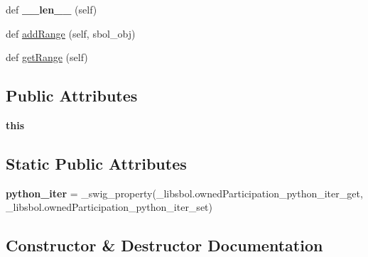 \begin{DoxyCompactItemize}
\item 
def {\bfseries \+\_\+\+\_\+len\+\_\+\+\_\+} (self)\hypertarget{classsbol_1_1libsbol_1_1owned_participation_a664aa8ce4ef4f8f430398587d65712b4}{}\label{classsbol_1_1libsbol_1_1owned_participation_a664aa8ce4ef4f8f430398587d65712b4}

\item 
def \hyperlink{classsbol_1_1libsbol_1_1owned_participation_ad7da2f4b17328e332e9cf1d112c61afa}{add\+Range} (self, sbol\+\_\+obj)
\item 
def \hyperlink{classsbol_1_1libsbol_1_1owned_participation_ac8f3a7529ef59b0c26453deca9853e0f}{get\+Range} (self)
\end{DoxyCompactItemize}
\subsection*{Public Attributes}
\begin{DoxyCompactItemize}
\item 
{\bfseries this}\hypertarget{classsbol_1_1libsbol_1_1owned_participation_a71ff8007d3575ca08734d922b7106e6d}{}\label{classsbol_1_1libsbol_1_1owned_participation_a71ff8007d3575ca08734d922b7106e6d}

\end{DoxyCompactItemize}
\subsection*{Static Public Attributes}
\begin{DoxyCompactItemize}
\item 
{\bfseries python\+\_\+iter} = \+\_\+swig\+\_\+property(\+\_\+libsbol.\+owned\+Participation\+\_\+python\+\_\+iter\+\_\+get, \+\_\+libsbol.\+owned\+Participation\+\_\+python\+\_\+iter\+\_\+set)\hypertarget{classsbol_1_1libsbol_1_1owned_participation_a27f0b38cb941000cb07a15ba05b7f387}{}\label{classsbol_1_1libsbol_1_1owned_participation_a27f0b38cb941000cb07a15ba05b7f387}

\end{DoxyCompactItemize}


\subsection{Constructor \& Destructor Documentation}
